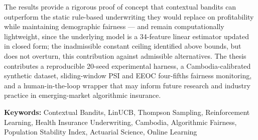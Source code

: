 The results provide a rigorous proof of concept that contextual bandits can outperform the static rule-based underwriting they would replace on profitability while maintaining demographic fairness --- and remain computationally lightweight, since the underlying model is a 34-feature linear estimator updated in closed form; the inadmissible constant ceiling identified above bounds, but does not overturn, this contribution against admissible alternatives. The thesis contributes a reproducible 20-seed experimental harness, a Cambodia-calibrated synthetic dataset, sliding-window PSI and EEOC four-fifths fairness monitoring, and a human-in-the-loop wrapper that may inform future research and industry practice in emerging-market algorithmic insurance.

\bigskip
\noindent\textbf{Keywords:} Contextual Bandits, LinUCB, Thompson Sampling, Reinforcement Learning, Health Insurance Underwriting, Cambodia, Algorithmic Fairness, Population Stability Index, Actuarial Science, Online Learning
